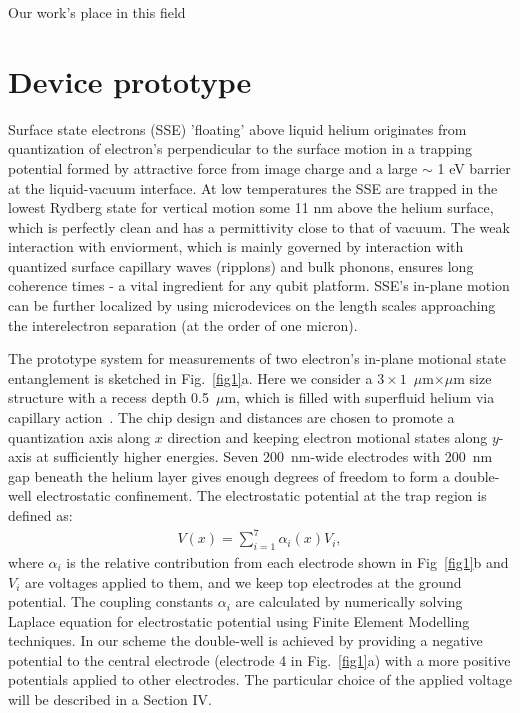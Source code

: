 \documentclass[twocolumn,superscriptaddress,unsortedaddress,
 amsmath,amssymb,
 aps,
]{revtex4-2}
\begin{document}
Our work's place in this field


\section{Device prototype} %
Surface state electrons (SSE) 'floating' above liquid helium originates from quantization of electron's perpendicular to the surface motion in a trapping potential formed by attractive force from image charge and a large $\sim$ 1 eV barrier at the liquid-vacuum interface. At low temperatures the SSE are trapped in the lowest Rydberg state for vertical motion some 11 nm above the helium surface, which is perfectly clean and has a permittivity close to that of vacuum. The weak interaction with enviorment, which is mainly governed by interaction with quantized surface capillary waves (ripplons) and bulk phonons, ensures long coherence times - a vital ingredient for any qubit platform. SSE's in-plane motion can be further localized by using microdevices on the length scales approaching the interelectron separation (at the order of one micron).

The prototype system for measurements of two electron's in-plane motional state entanglement is sketched in Fig.~\ref{fig1}a. Here we consider a $3 \times 1$~$\mu$m$\times\mu$m size structure with a recess depth 0.5~$\mu$m, which is filled with superfluid helium via capillary action~\cite{marty1986stability}. The chip design and distances are chosen to promote a quantization axis along $x$ direction and keeping electron motional states along $y$-axis at sufficiently higher energies. Seven 200~nm-wide electrodes with 200~nm gap beneath the helium layer gives enough degrees of freedom to form a double-well electrostatic confinement. The electrostatic potential at the trap region is defined as:
\begin{align}
            V(x) = \sum_{i=1}^7 \alpha_i(x) V_i,
            \label{eq:trap}
\end{align}
where $\alpha_i$ is the relative contribution from each electrode shown in Fig~\ref{fig1}b and $V_i$ are voltages applied to them, and we keep top electrodes at the ground potential. The coupling constants $\alpha_i$ are calculated by numerically solving Laplace equation for electrostatic potential using Finite Element Modelling techniques. In our scheme the double-well is achieved by providing a negative potential to the central electrode (electrode 4 in Fig.~\ref{fig1}a) with a more positive potentials applied to other electrodes. The particular choice of the applied voltage will be described in a Section IV.
\end{document}
